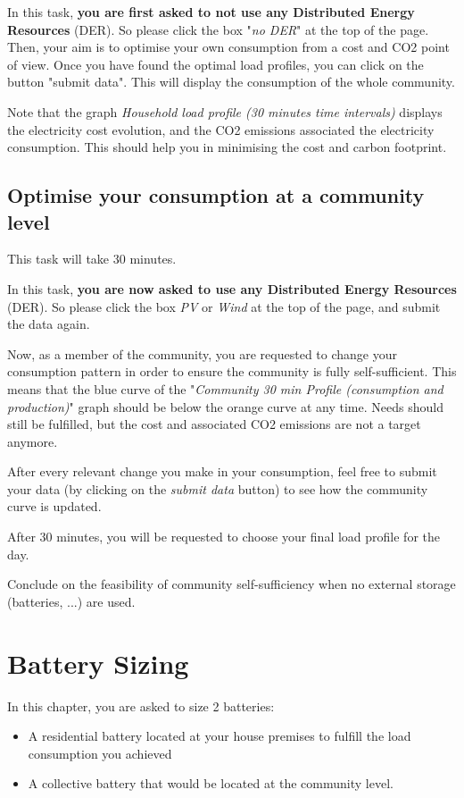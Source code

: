 \documentclass[a4paper, chapterprefix=true, openany]{scrbook}
\begin{document}
In this task,\textbf{ you are first asked to not use any Distributed Energy Resources} (DER). So please click the box "\textit{no DER}" at the top of the page.
Then, your aim is to optimise your own consumption from a cost and CO2 point of view. 
Once you have found the optimal load profiles, you can click on the button "submit data". This will display the consumption of the whole community.

Note that the graph \textit{Household load profile (30 minutes time intervals)} displays the electricity cost evolution, and the CO2 emissions associated the electricity consumption. This should help you in minimising the cost and carbon footprint.



	\section{Optimise your consumption at a community level}

This task will take 30 minutes. 

In this task, \textbf{ you are now asked to use any Distributed Energy Resources} (DER). So please click the box \textit{PV} or \textit{Wind}   at the top of the page, and submit the data again.


Now, as a member of the community, you are requested to change your consumption pattern in order to ensure the community is fully self-sufficient. This means that the blue curve of the "\textit{Community 30 min Profile (consumption and production)}" graph should be below the orange curve at any time. Needs should still be fulfilled, but the cost and associated CO2 emissions are not a target anymore.

After every relevant change you make in your consumption, feel free to submit your data (by clicking on the \textit{submit data} button) to see how the community curve is updated.

After 30 minutes, you will be requested to choose your final load profile for the day.

Conclude on the feasibility of community self-sufficiency when no external storage (batteries, ...) are used. 



\chapter{Battery Sizing}

In this chapter, you are asked to size 2 batteries: 
\begin{itemize}
	\item A residential battery located at your house premises to fulfill the load consumption you achieved
	\item A collective battery that would be located at the community level.
\end{itemize}
\end{document}
